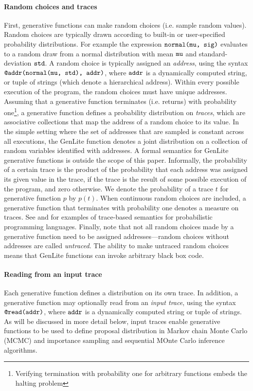 \paragraph{Random choices and traces}
First, generative functions can make random choices (i.e. sample random values).
Random choices are typically drawn according to built-in or user-specified probability distributions.
For example the expression $\mbox{\texttt{normal(mu, sig)}}$ evaluates to a random draw from a normal distribution with mean $\mbox{\texttt{mu}}$ and standard-deviation $\mbox{\texttt{std}}$.
A random choice is typically assigned an \emph{address}, using the syntax $\mbox{\texttt{@addr(normal(mu, std), addr)}}$, where $\mbox{\texttt{addr}}$ is a dynamically computed string, or tuple of strings (which denote a hierarchical address).
Within every possible execution of the program, the random choices must have unique addresses.
Assuming that a generative function terminates (i.e. returns) with probability one\footnote{Verifying termination with probability one for arbitrary functions embeds the halting problem}, a generative function defines a probability distribution on \emph{traces}, which are associative collections that map the address of a random choice to its value.
In the simple setting where the set of addresses that are sampled is constant across all executions, the GenLite function denotes a joint distribution on a collection of random variables identified with addresses.
A formal semantics for GenLite generative functions is outside the scope of this paper.
Informally, the probability of a certain trace is the product of the probability that each address was assigned its given value in the trace, if the trace is the result of some possible execution of the program, and zero otherwise.
We denote the probability of a trace $t$ for generative function $p$ by $p(t)$.
When continuous random choices are included, a generative function that terminates with probability one denotes a measure on traces.
See \cite{CusumanoPLDI2018} and \cite{Borgstrom} for examples of trace-based semantics for probabilistic programming languages.
Finally, note that not all random choices made by a generative function need to be assigned addresses---random choices without addresses are called \emph{untraced}.
The ability to make untraced random choices means that GenLite functions can invoke arbitrary black box code.

\paragraph{Reading from an input trace}
Each generative function defines a distribution on its own trace.
In addition, a generative function may optionally read from an \emph{input trace}, using the syntax $\mbox{\texttt{@read(addr)}}$, where $\mbox{\texttt{addr}}$ is a dynamically computed string or tuple of strings.
As will be discussed in more detail below, input traces enable generative functions to be used to define proposal distribution in Markov chain Monte Carlo (MCMC) and importance sampling and sequential MOnte Carlo inference algorithms.

